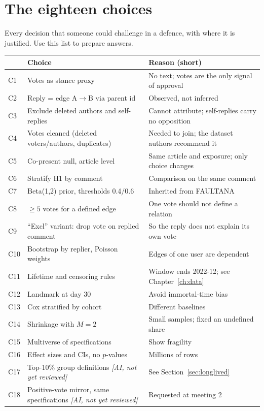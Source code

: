 \section{The eighteen choices}\label{sec:choices}
Every decision that someone could challenge in a defence, with where it is justified. Use this list to prepare answers.

\begin{longtable}{@{}l p{4.7cm} p{6.4cm}@{}}
\toprule
 & Choice & Reason (short) \\
\midrule
\endhead
C1 & Votes as stance proxy & No text; votes are the only signal of approval \\
C2 & Reply = edge A$\to$B via parent id & Observed, not inferred \\
C3 & Exclude deleted authors and self-replies & Cannot attribute; self-replies carry no opposition \\
C4 & Votes cleaned (deleted voters/authors, duplicates) & Needed to join; the dataset authors recommend it \\
C5 & Co-present null, article level & Same article and exposure; only choice changes \\
C6 & Stratify H1 by comment & Comparison on the same comment \\
C7 & Beta(1,2) prior, thresholds 0.4/0.6 & Inherited from FAULTANA \\
C8 & $\ge5$ votes for a defined edge & One vote should not define a relation \\
C9 & ``Excl'' variant: drop vote on replied comment & So the reply does not explain its own vote \\
C10 & Bootstrap by replier, Poisson weights & Edges of one user are dependent \\
C11 & Lifetime and censoring rules & Window ends 2022-12; see Chapter~\ref{ch:data} \\
C12 & Landmark at day 30 & Avoid immortal-time bias \\
C13 & Cox stratified by cohort & Different baselines \\
C14 & Shrinkage with $M=2$ & Small samples; fixed an undefined share \\
C15 & Multiverse of specifications & Show fragility \\
C16 & Effect sizes and CIs, no $p$-values & Millions of rows \\
C17 & Top-10\% group definitions \emph{[AI, not yet reviewed]} & See Section~\ref{sec:longlived} \\
C18 & Positive-vote mirror, same specifications \emph{[AI, not yet reviewed]} & Requested at meeting 2 \\
\bottomrule
\end{longtable}

